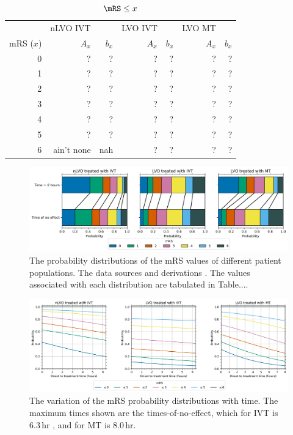 \begin{table}
    \centering
    \begin{tabular}{rrrrrrr}
        \hline 
        & nLVO IVT & & LVO IVT & & LVO MT & \\
        mRS ($x$) & $A_x$ & $b_x$ & $A_x$ & $b_x$ & $A_x$ & $b_x$ \\ 
        \hline 
        0 & ? & ? & ? & ?  & ? & ? \\
        1 & ? & ?  & ? & ?  & ? & ? \\
        2 & ? & ?  & ? & ?  & ? & ? \\
        3 & ? & ?  & ? & ?  & ? & ? \\
        4 & ? & ?  & ? & ?  & ? & ? \\
        5 & ? & ?  & ? & ?  & ? & ? \\
        6 & ain't none & nah & ? & ? & ? & ? \\
        \hline
    \end{tabular}
    \caption{ $\mRS\leq x$}
    \label{tab:probs_with_time}
\end{table}

\begin{figure}
    \centering
    \includegraphics[width=\columnwidth]{images/dist_bars.jpg}
    \caption{
        The probability distributions of the mRS values of different patient populations. 
        The data sources and derivations .
        The values associated with each distribution are tabulated in Table.... }
    \label{fig:dist_bars}
\end{figure}

\begin{figure}
    \centering
    \includegraphics[width=\columnwidth]{images/probs_with_time.jpg}
    \caption{
        The variation of the mRS probability distributions with time.
        The maximum times shown are the times-of-no-effect, which for IVT is 6.3\,hr \cite{emberson_effect_2014},
        and for MT is 8.0\,hr\cite{goyal_endovascular_2016}.
        }
    \label{fig:probs_with_time}
\end{figure}

